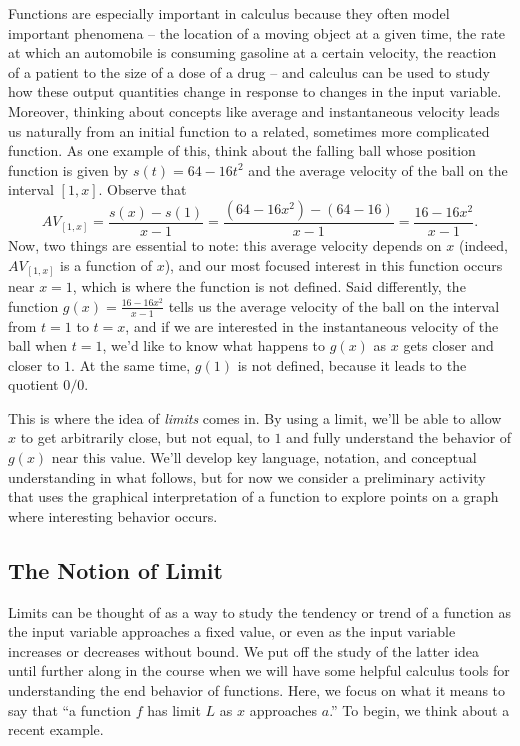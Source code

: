 Functions are especially important in calculus because they often model important phenomena -- the location of a moving object at a given time, the rate at which an automobile is consuming gasoline at a certain velocity, the reaction of a patient to the size of a dose of a drug -- and calculus can be used to study how these output quantities change in response to changes in the input variable.  Moreover, thinking about concepts like average and instantaneous velocity leads us naturally from an initial function to a related, sometimes more complicated function.  As one example of this, think about the falling ball whose position function is given by $s(t) = 64 - 16t^2$ and the average velocity of the ball on the interval $[1,x]$.  Observe that
$$AV_{[1,x]} = \frac{s(x) - s(1)}{x-1} = \frac{(64-16x^2) - (64-16)}{x-1} = \frac{16 - 16x^2}{x-1}.$$
Now, two things are essential to note:  this average velocity depends on $x$ (indeed, $AV_{[1,x]}$ is a function of $x$), and our most focused interest in this function occurs near $x = 1$, which is where the function is not defined.  Said differently, the function $g(x) = \frac{16 - 16x^2}{x-1}$ tells us the average velocity of the ball on the interval from $t = 1$ to $t = x$, and if we are interested in the instantaneous velocity of the ball when $t = 1$, we'd like to know what happens to $g(x)$ as $x$ gets closer and closer to $1$.  At the same time, $g(1)$ is not defined, because it leads to the quotient $0/0$.

This is where the idea of \emph{limits} comes in.  By using a limit, we'll be able to allow $x$ to get arbitrarily close, but not equal, to $1$ and fully understand the behavior of $g(x)$ near this value.  We'll develop key language, notation, and conceptual understanding in what follows, but for now we consider a preliminary activity that uses the graphical interpretation of a function to explore points on a graph where interesting behavior occurs.



\subsection*{The Notion of Limit}

Limits can be thought of as a way to study the tendency or trend of a function as the input variable approaches a fixed value, or even as the input variable increases or decreases without bound.  We put off the study of the latter idea until further along in the course when we will have some helpful calculus tools for understanding the end behavior of functions.  Here, we focus on what it means to say that ``a function $f$ has limit $L$ as $x$ approaches $a$.''  To begin, we think about a recent example.

